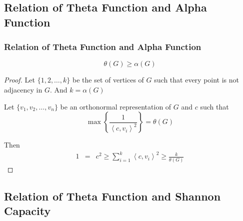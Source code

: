 \subsection*{Relation of Theta Function and Alpha Function}

      \begin{frame}
            \frametitle{Relation of Theta Function and Alpha Function}

            \begin{lemma}
                  \begin{equation}
                        \theta(G) \geq \alpha(G)
                  \end{equation}
            \end{lemma}

            \pause

            \begin{proof}
                  Let $ \{1,2,\dots,k\} $ be the set of vertices of $ G $ such that every point is not adjacency in $ G $. And $ k = \alpha(G) $
      
                  Let $ \{v_1, v_2, \dots, v_n\} $ be an orthonormal representation of $ G $ and $ c $ such that
                  \begin{equation}
                        \max \left\{ \frac{1}{\left<c,v_{i}\right>^2} \right\} = \theta(G)
                  \end{equation}
                        
                  Then
                  \begin{eqnarray}
                        1 &=& c^{2}
                        \geq \sum_{i=1}^{k} \left<c,v_{i}\right>^{2}
                        \geq \frac{k}{\theta(G)}
                  \end{eqnarray}
            \end{proof}
      \end{frame}

\subsection*{Relation of Theta Function and Shannon Capacity}
      
